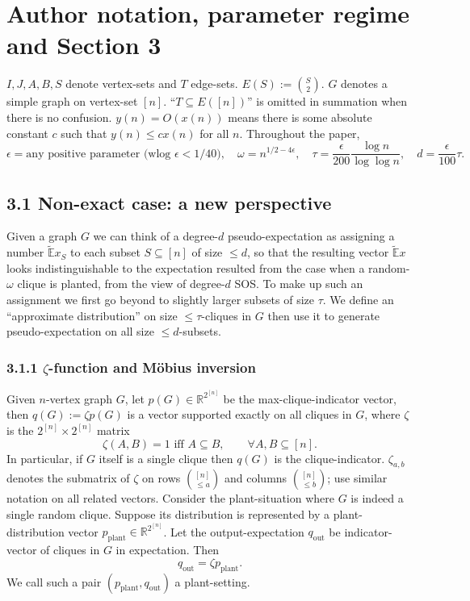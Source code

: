 \section*{Author notation, parameter regime and Section 3}
$I,J,A,B,S$ denote vertex-sets and $T$ edge-sets. $E(S):=\binom S2$. $G$ denotes a simple graph on vertex-set $[n]$. ``$T\subseteq E([n])$'' is omitted in summation when there is no confusion. $y(n)=O(x(n))$ means there is some absolute constant $c$ such that $y(n)\le cx(n)$ for all $n$.
Throughout the paper,
\[\epsilon=\text{any positive parameter (wlog }\epsilon<1/40),\quad\omega=n^{1/2-4\epsilon},\quad\tau=\frac\epsilon{200}\frac{\log n}{\log\log n},\quad d=\frac\epsilon{100}\tau.\]
\subsection*{3.1 Non-exact case: a new perspective}
Given a graph $G$ we can think of a degree-$d$ pseudo-expectation as assigning a number $\widetilde{\mathbb E}x_S$ to each subset $S\subseteq[n]$ of size $\le d$, so that the resulting vector $\widetilde{\mathbb E}x$ looks indistinguishable to the expectation resulted from the case when a random-$\omega$ clique is planted, from the view of degree-$d$ SOS. To make up such an assignment we first go beyond to slightly larger subsets of size $\tau$. We define an ``approximate distribution'' on size $\le\tau$-cliques in $G$ then use it to generate pseudo-expectation on all size $\le d$-subsets.
\subsubsection*{3.1.1 $\zeta$-function and M\"obius inversion}
Given $n$-vertex graph $G$, let $p(G)\in\mathbb R^{2^{[n]}}$ be the max-clique-indicator vector, then $q(G):=\zeta p(G)$ is a vector supported exactly on all cliques in $G$, where $\zeta$ is the $2^{[n]}\times2^{[n]}$ matrix
\[\zeta(A,B)=1\text{ iff }A\subseteq B,\qquad\forall A,B\subseteq[n].\tag{3.1}\]
In particular, if $G$ itself is a single clique then $q(G)$ is the clique-indicator. $\zeta_{a,b}$ denotes the submatrix of $\zeta$ on rows $\binom{[n]}{\le a}$ and columns $\binom{[n]}{\le b}$; use similar notation on all related vectors. Consider the plant-situation where $G$ is indeed a single random clique. Suppose its distribution is represented by a plant-distribution vector $p_{\mathrm{plant}}\in\mathbb R^{2^{[n]}}$. Let the output-expectation $q_{\mathrm{out}}$ be indicator-vector of cliques in $G$ in expectation. Then
\[q_{\mathrm{out}}=\zeta p_{\mathrm{plant}}.\tag{3.2}\]
We call such a pair $(p_{\mathrm{plant}},q_{\mathrm{out}})$ a plant-setting.
